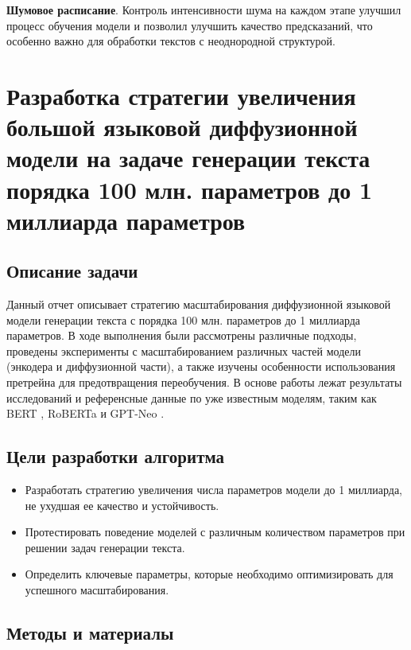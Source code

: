 \documentclass[a4paper, 12pt]{article}
\begin{document}
\textbf{Шумовое расписание}. Контроль интенсивности шума на каждом этапе улучшил процесс обучения модели и позволил улучшить качество предсказаний, что особенно важно для обработки текстов с неоднородной структурой.



\section{Разработка стратегии увеличения большой языковой диффузионной модели на задаче генерации текста порядка 100 млн. параметров до 1 миллиарда параметров}
\subsection{Описание задачи}

Данный отчет описывает стратегию масштабирования диффузионной языковой модели генерации текста с порядка 100 млн. параметров до 1 миллиарда параметров. В ходе выполнения были рассмотрены различные подходы, проведены эксперименты с масштабированием различных частей модели (энкодера и диффузионной части), а также изучены особенности использования претрейна для предотвращения переобучения. В основе работы лежат результаты исследований и референсные данные по уже известным моделям, таким как BERT \cite{devlin2019bertpretrainingdeepbidirectional}, RoBERTa \cite{liu2019robertarobustlyoptimizedbert} и GPT-Neo \cite{kashyap2023gptneocommonsensereasoning}.

\subsection{Цели разработки алгоритма}

\begin{itemize}
    \item Разработать стратегию увеличения числа параметров модели до 1 миллиарда, не ухудшая ее качество и устойчивость.
    \item Протестировать поведение моделей с различным количеством параметров при решении задач генерации текста.
    \item Определить ключевые параметры, которые необходимо оптимизировать для успешного масштабирования.
\end{itemize}

\subsection{Методы и материалы}
\end{document}

